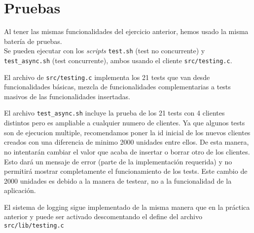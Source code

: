 \section{Pruebas}
Al tener las mismas funcionalidades del ejercicio anterior, hemos usado la misma batería de pruebas.\\
Se pueden ejecutar con los \textit{scripts} \texttt{test.sh} (test no concurrente) y \texttt{test\_async.sh} (test concurrente), ambos usando el cliente \texttt{src/testing.c}.

El archivo de \texttt{src/testing.c} implementa los 21 tests que van desde funcionalidades básicas, mezcla de funcionalidades complementarias a tests masivos de las funcionalidades insertadas.

El archivo \texttt{test\_async.sh} incluye la prueba de los 21 tests con 4 clientes distintos pero es ampliable a cualquier numero de clientes. Ya que algunos tests son de ejecucion multiple, recomendamos poner la id inicial de los nuevos clientes creados con una diferencia de minimo 2000 unidades entre ellos. De esta manera, no intentarán cambiar el valor que acaba de insertar o borrar otro de los clientes. Esto dará un mensaje de error (parte de la implementación requerida) y no permitirá mostrar completamente el funcionamiento de los tests. Este cambio de 2000 unidades es debido a la manera de testear, no a la funcionalidad de la aplicación.

El sistema de logging sigue implementado de la misma manera que en la práctica anterior y puede ser activado descomentando el define del archivo \texttt{src/lib/testing.c}